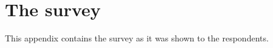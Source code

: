 \chapter{The survey}
\label{chp:appendixA} 
This appendix contains the survey as it was shown to the respondents. 
